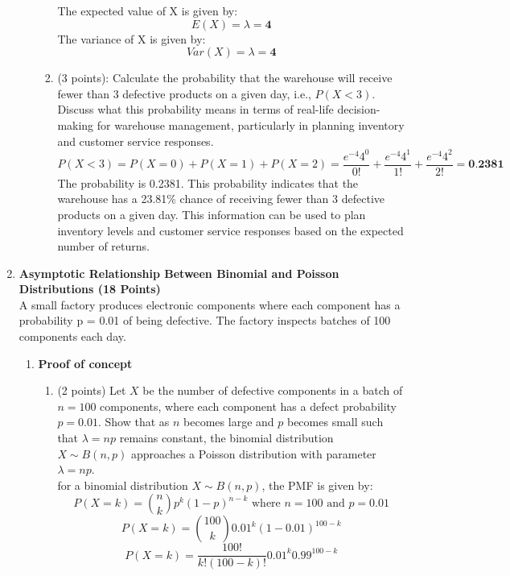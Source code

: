 \documentclass[a3paper,12pt]{article} %
\begin{document}
\begin{enumerate}
\begin{enumerate}
\begin{enumerate}
            The expected value of X is given by:
            \[
            E(X) = \lambda = \textbf{4}
            \]
            The variance of X is given by:
            \[
            Var(X) = \lambda = \textbf{4}
            \]
            \item (3 points): Calculate the probability that the warehouse will receive fewer than 3 defective products on a given day, i.e., \(P(X < 3)\). Discuss what this probability means in terms of real-life decision-making for warehouse management, particularly in planning inventory and customer service responses.
            \[
            P(X < 3) = P(X = 0) + P(X = 1) + P(X = 2) = \frac{e^{-4} 4^0}{0!} + \frac{e^{-4} 4^1}{1!} + \frac{e^{-4} 4^2}{2!} = \textbf{0.2381}
            \]
            The probability is 0.2381. This probability indicates that the warehouse has a 23.81\% chance of receiving fewer than 3 defective products on a given day. This information can be used to plan inventory levels and customer service responses based on the expected number of returns.
        \end{enumerate}
    \end{enumerate}
    \newpage
    \item \textbf{Asymptotic Relationship Between Binomial and Poisson Distributions (18 Points)}
    \\ A small factory produces electronic components where each component has a probability p = 0.01 of being defective. The factory inspects batches of 100 components each day.
    \begin{enumerate}
        \item \textbf{Proof of concept}
        \begin{enumerate}
            \item (2 points) Let \( X \) be the number of defective components in a batch of \( n = 100 \) components, where each component has a defect probability \( p = 0.01 \). Show that as \( n \) becomes large and \( p \) becomes small such that \( \lambda = np \) remains constant, the binomial distribution \( X \sim B(n, p) \) approaches a Poisson distribution with parameter \( \lambda = np \).
            \\ for a binomial distribution  \( X \sim B(n, p) \), the PMF is given by:
            \[
                P(X = k) = \binom{n}{k} p^k (1 - p)^{n - k} \text{ where } n = 100 \text{ and } p = 0.01
            \]
            \[
                P(X = k) = \binom{100}{k} 0.01^k (1 - 0.01)^{100 - k}
            \]
            \[
                P(X = k) = \frac{100!}{k!(100 - k)!} 0.01^k 0.99^{100 - k}
\]
\end{enumerate}
\end{enumerate}
\end{enumerate}
\end{document}
